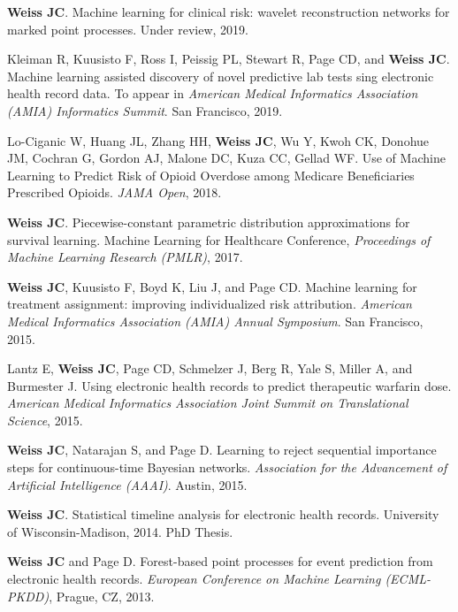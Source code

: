 \begin{bibsection}
\item  \textbf{Weiss JC}. Machine learning for clinical risk: wavelet reconstruction networks for marked point processes. Under review, 2019.

\item  Kleiman R, Kuusisto F, Ross I, Peissig PL, Stewart R, Page CD, and \textbf{Weiss JC}. Machine learning assisted discovery of novel predictive lab tests sing electronic health record data. To appear in \emph{American Medical Informatics Association (AMIA) Informatics Summit}. San Francisco, 2019.

\item  Lo-Ciganic W, Huang JL, Zhang HH, \textbf{Weiss JC}, Wu Y, Kwoh CK, Donohue JM, Cochran G, Gordon AJ, Malone DC, Kuza CC, Gellad WF. Use of Machine Learning to Predict Risk of Opioid Overdose among Medicare Beneficiaries Prescribed Opioids. \emph{JAMA Open}, 2018.
  
\item  \textbf{Weiss JC}. Piecewise-constant parametric distribution approximations for survival learning. Machine Learning for Healthcare Conference, \emph{Proceedings of Machine Learning Research (PMLR)}, 2017.

\item  \textbf{Weiss JC}, Kuusisto F, Boyd K, Liu J, and Page CD. Machine learning for treatment assignment: improving individualized risk attribution. \textit{American Medical Informatics Association (AMIA) Annual Symposium}. San Francisco, 2015.

\item  Lantz E, \textbf{Weiss JC}, Page CD, Schmelzer J, Berg R, Yale S, Miller A, and Burmester J. Using electronic health records to predict therapeutic warfarin dose. \textit{American Medical Informatics Association Joint Summit on Translational Science}, 2015.

\item  \textbf{Weiss JC}, Natarajan S, and Page D. Learning to reject sequential importance steps for continuous-time Bayesian networks. \textit{Association for the Advancement of Artificial Intelligence (AAAI)}. Austin, 2015.

\item  \textbf{Weiss JC}. Statistical timeline analysis for electronic health records. University of Wisconsin-Madison, 2014. PhD Thesis.

\item  \textbf{Weiss JC} and Page D. Forest-based point processes for event prediction from electronic health records. \textit{European Conference on Machine Learning (ECML-PKDD)}, Prague, CZ, 2013.


\end{bibsection}
